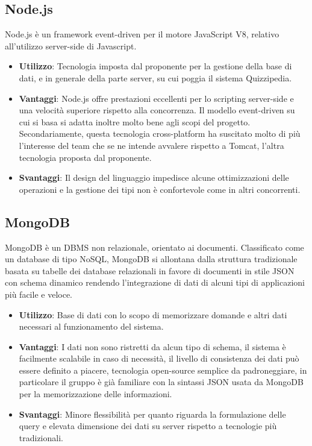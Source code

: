 	\subsection{Node.js}
	 Node.js è un framework event-driven per il motore JavaScript V8, relativo all'utilizzo server-side di Javascript.
	\begin{itemize}
		\item\textbf{Utilizzo}: Tecnologia imposta dal proponente per la gestione della base di dati, e in generale della parte server, su cui poggia il sistema Quizzipedia.
		\item\textbf{Vantaggi}: Node.js offre prestazioni eccellenti per lo scripting server-side e una velocità superiore rispetto alla concorrenza. Il modello event-driven su cui si basa si adatta inoltre molto bene agli scopi del progetto. Secondariamente, questa tecnologia cross-platform ha suscitato molto di più l'interesse del team che se ne intende avvalere rispetto a Tomcat, l'altra tecnologia proposta dal proponente.
		\item\textbf{Svantaggi}: Il design del linguaggio impedisce alcune ottimizzazioni delle operazioni e la gestione dei tipi non è confortevole come in altri concorrenti.
	\end{itemize}
	\subsection{MongoDB}
	MongoDB è un DBMS non relazionale, orientato ai documenti. Classificato come un database di tipo NoSQL, MongoDB si allontana dalla struttura tradizionale basata su tabelle dei database relazionali in favore di documenti in stile JSON con schema dinamico rendendo l'integrazione di dati di alcuni tipi di applicazioni più facile e veloce.
	\begin{itemize}
		\item\textbf{Utilizzo}: Base di dati con lo scopo di memorizzare domande e altri dati necessari al funzionamento del sistema.
		\item\textbf{Vantaggi}: I dati non sono ristretti da alcun tipo di schema, il sistema è facilmente scalabile in caso di necessità, il livello di consistenza dei dati può essere definito a piacere, tecnologia open-source semplice da padroneggiare, in particolare il gruppo è già familiare con la sintassi JSON usata da MongoDB per la memorizzazione delle informazioni.
		\item\textbf{Svantaggi}: Minore flessibilità per quanto riguarda la formulazione delle query e elevata dimensione dei dati su server rispetto a tecnologie più tradizionali.
	\end{itemize}
